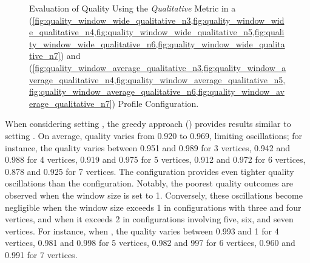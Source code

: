 \begin{figure}[H]
\begin{adjustbox}{minipage=\linewidth,scale=0.75}
\begin{subfigure}{0.45\textwidth}
      \end{subfigure}

    \caption{Evaluation of Quality Using the \emph{Qualitative} Metric in a \wide (\cref{fig:quality_window_wide_qualitative_n3,fig:quality_window_wide_qualitative_n4,fig:quality_window_wide_qualitative_n5,fig:quality_window_wide_qualitative_n6,fig:quality_window_wide_qualitative_n7}) and \average (\cref{fig:quality_window_average_qualitative_n3,fig:quality_window_average_qualitative_n4,fig:quality_window_average_qualitative_n5,fig:quality_window_average_qualitative_n6,fig:quality_window_average_qualitative_n7}) Profile Configuration.}  \label{fig:quality_window_qualitative}
  \end{adjustbox}
  \end{figure}

  When considering setting \average, the greedy approach () provides results similar to setting \wide. On average, quality varies from 0.920 to 0.969, limiting oscillations; for instance, the quality varies between 0.951 and 0.989 for 3 vertices, 0.942 and 0.988 for 4 vertices, 0.919 and 0.975 for 5 vertices, 0.912 and 0.972 for 6 vertices, 0.878 and 0.925 for 7 vertices. The \average configuration provides even tighter quality oscillations than the \wide configuration. Notably, the poorest quality outcomes are observed when the window size is set to 1. Conversely, these oscillations become negligible when the window size exceeds 1 in configurations with three and four vertices, and when it exceeds 2 in configurations involving five, six, and seven vertices.  For instance, when , the quality varies between  0.993 and 1 for 4 vertices, 0.981 and 0.998 for 5 vertices, 0.982 and 997 for 6 vertices, 0.960 and 0.991 for 7 vertices.
